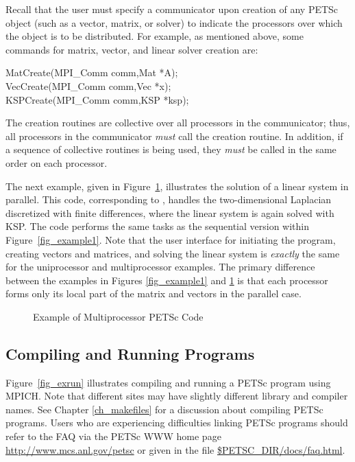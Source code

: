 Recall that the user must specify a communicator upon creation of any
PETSc object (such as a vector, matrix, or solver) to indicate the
processors over which the object is to be distributed.  For example,
as mentioned above, some commands for matrix, vector, and linear solver
creation are:
\begin{tabbing}
  MatCreate(MPI\_Comm comm,Mat *A);\\
  VecCreate(MPI\_Comm comm,Vec *x);\\
  KSPCreate(MPI\_Comm comm,KSP *ksp); 
\end{tabbing}
The creation routines are collective over all processors in the
communicator; thus, all processors in the communicator {\em must}
call the creation routine.  In addition, if a sequence of
collective routines is being used, they {\em must} be called
in the same order on each processor.

The next example, given in Figure~\ref{fig_example2}, illustrates the
solution of a linear system in parallel.  This code, corresponding to
, handles the
two-dimensional Laplacian discretized with finite differences, where
the linear system is again solved with KSP.  The code performs the
same tasks as the sequential version within Figure~\ref{fig_example1}.
Note that the user interface for initiating the program, creating
vectors and matrices, and solving the linear system is {\em exactly}
the same for the uniprocessor and multiprocessor examples.  The
primary difference between the examples in Figures \ref{fig_example1}
and \ref{fig_example2} is that each processor forms only its local
part of the matrix and vectors in the parallel case.

\begin{figure}[H]
{\footnotesize
{}
}
\nobreak
\caption{Example of Multiprocessor PETSc Code}
\label{fig_example2}
\end{figure}

\subsection*{Compiling and Running Programs}

Figure~\ref{fig_exrun} illustrates compiling and running a PETSc program
using MPICH.  Note that different sites may have slightly different
library and compiler names.  See Chapter \ref{ch_makefiles}
for a discussion about compiling PETSc programs.
Users who are experiencing difficulties linking PETSc programs should 
refer to the FAQ  via the PETSc WWW home page 
\href{http://www.mcs.anl.gov/petsc}{http://www.mcs.anl.gov/petsc} or
given in the file \href{faq.html}{\${PETSC\_DIR}/docs/faq.html}.

